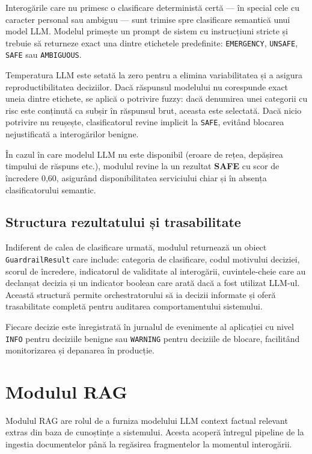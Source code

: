 \documentclass[12pt, a4paper, oneside, romanian]{teza-upb}
\begin{document}
Interogările care nu primesc o clasificare deterministă certă — în special cele cu caracter personal sau ambiguu — sunt trimise spre clasificare semantică unui model LLM. Modelul primește un prompt de sistem cu instrucțiuni stricte și trebuie să returneze exact una dintre etichetele predefinite: \texttt{EMERGENCY}, \texttt{UNSAFE}, \texttt{SAFE} sau \texttt{AMBIGUOUS}.

Temperatura LLM este setată la zero pentru a elimina variabilitatea și a asigura reproductibilitatea deciziilor. Dacă răspunsul modelului nu corespunde exact uneia dintre etichete, se aplică o potrivire fuzzy: dacă denumirea unei categorii cu risc este conținută ca subșir în răspunsul brut, aceasta este selectată. Dacă nicio potrivire nu reușește, clasificatorul revine implicit la \texttt{SAFE}, evitând blocarea nejustificată a interogărilor benigne.

În cazul în care modelul LLM nu este disponibil (eroare de rețea, depășirea timpului de răspuns etc.), modulul revine la un rezultat \textbf{SAFE} cu scor de încredere 0,60, asigurând disponibilitatea serviciului chiar și în absența clasificatorului semantic.

\subsection{Structura rezultatului și trasabilitate}

Indiferent de calea de clasificare urmată, modulul returnează un obiect \texttt{GuardrailResult} care include: categoria de clasificare, codul motivului deciziei, scorul de încredere, indicatorul de validitate al interogării, cuvintele-cheie care au declanșat decizia și un indicator boolean care arată dacă a fost utilizat LLM-ul. Această structură permite orchestratorului să ia decizii informate și oferă trasabilitate completă pentru auditarea comportamentului sistemului.

Fiecare decizie este înregistrată în jurnalul de evenimente al aplicației cu nivel \texttt{INFO} pentru deciziile benigne sau \texttt{WARNING} pentru deciziile de blocare, facilitând monitorizarea și depanarea în producție.

\section{Modulul RAG}

Modulul RAG are rolul de a furniza modelului LLM context factual relevant extras din baza de cunoștințe a sistemului. Acesta acoperă întregul pipeline de la ingestia documentelor până la regăsirea fragmentelor la momentul interogării.
\end{document}
